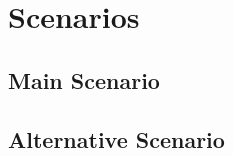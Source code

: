 \documentclass[notitlepage]{article}
\begin{document}
\begin{comment}
     \noindent Simulation thread run trigger will be set to true. Frame collection is updated again. 
\end{comment}

\section{Scenarios}\label{sec:scenarios}

\subsection{Main Scenario}\label{subsec:main:scenario}

\begin{comment}
	\begin{itemize}
  		\item Simulation thread run trigger will be set to true.
  		\item Frame got updated after each iterations.
  		\item Canvas and app got updated after receive message from frame collection.
  		\item Iteration count reach limit.
  		\item Simulation end.
  		\item Pop up window show the summary.
	\end{itemize}
\end{comment}

\subsection{Alternative Scenario}\label{subsec:alternative:scenario}

\begin{comment}
	\begin{itemize}
  		\item window is deactivated. Simulation will be paused automatically.
  		\item Pause button is pressed. Simulation will be paused.
  		\item Stop button is clicked. Simulation will be terminated early.
  		\item Pop up window show the summary.
	\end{itemize}
\end{comment}
\end{document}
